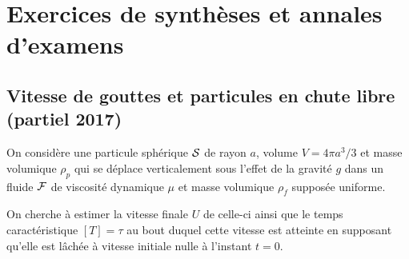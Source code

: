 


\appendix
\section{Exercices de synthèses et annales d'examens}





\subsection{Vitesse de gouttes et particules en chute libre (partiel 2017)}


On considère une particule sphérique $ {\cal S}$ de rayon $a$, volume $V = 4 \pi a^3/3$
et masse volumique $\rho_p$ qui se déplace verticalement sous l'effet de la gravité $g$ dans un fluide ${\cal F}$ de viscosité dynamique $\mu$ et masse volumique $\rho_f$ supposée uniforme.  

On cherche à estimer la vitesse finale $U$ de celle-ci ainsi que le temps caractéristique 
$[T] =  \tau$ au bout duquel cette vitesse est atteinte en supposant qu'elle est lâchée à vitesse initiale nulle à l'instant $t=0$.

